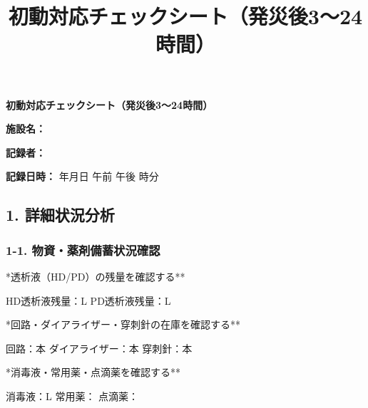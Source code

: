 \documentclass[
  japanese,
  letterpaper,
  DIV=11,
  numbers=noendperiod]{scrartcl}
\title{初動対応チェックシート（発災後3～24時間）}
\author{}
\date{}
\begin{document}
\maketitle


\begin{center}
{\Large\textbf{初動対応チェックシート（発災後3～24時間）}}
\end{center}
\vspace{5mm}

\noindent \textbf{施設名：} \underlinespace{8cm}

\vspace{3mm}

\noindent \textbf{記録者：} \underlinespace{4cm}

\vspace{3mm}

\noindent \textbf{記録日時：}
\underlinespace{2cm}年\underlinespace{1cm}月\underlinespace{1cm}日
\quad \circlecheck 午前 \quad \circlecheck 午後
\quad \underlinespace{1cm}時\underlinespace{1cm}分

\vspace{5mm}

\subsection{1. 詳細状況分析}\label{ux8a73ux7d30ux72b6ux6cc1ux5206ux6790}

\subsubsection{1-1.
物資・薬剤備蓄状況確認}\label{ux7269ux8cc7ux85acux5264ux5099ux84c4ux72b6ux6cc1ux78baux8a8d}

\checkbox **透析液（HD/PD）の残量を確認する**

\quad HD透析液残量：\underlinespace{3cm}L
\quad PD透析液残量：\underlinespace{3cm}L

\vspace{3mm}

\checkbox **回路・ダイアライザー・穿刺針の在庫を確認する**

\quad 回路：\underlinespace{3cm}本
\quad ダイアライザー：\underlinespace{3cm}本
\quad 穿刺針：\underlinespace{3cm}本

\vspace{3mm}

\checkbox **消毒液・常用薬・点滴薬を確認する**

\quad 消毒液：\underlinespace{3cm}L \quad 常用薬：\underlinespace{6cm}
\quad 点滴薬：\underlinespace{6cm}
\end{document}
